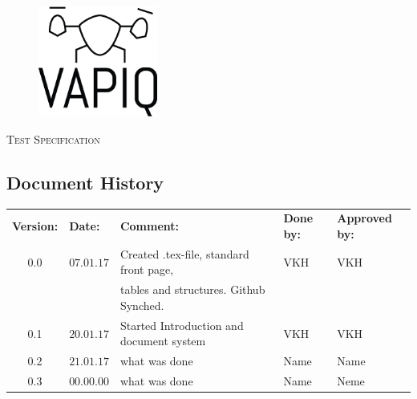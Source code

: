 \documentclass{article}
\author{Aleksander Holthe  \\ Katrine Sundal Haune \\ Kent Kjeldaas \\ Stian Fredriksen \\ Tomas Lyngroth \\ Vanja Katinka Halvorsen}
\makeatletter
\let\vapiqteam\@author
\makeatother
\begin{document}
\begin{titlepage}
    \centering
    \pagecolor{gainsboro}
	\\[3.0 cm]
    \begin{figure}[h]
        \centering
        \includegraphics[width = 0.35\textwidth]{VAPIQ-PICTURES//Logo2_Tilted.png}
        \\[2.0 cm] 
    \end{figure}                              
    \textsc{\Huge Test Specification}  
    \\[4 cm]
	\large \vapiqteam      
\end{titlepage}
\pagecolor{white}


\begin{center}
\section*{\textbf{Document History}}
\begin{tabular}{cllll}
\rowcolor{cadetgrey}
\textbf{Version:}    &\textbf{Date:} 	 &\textbf{Comment:}    &\textbf{Done by:}   &\textbf{Approved by:}  \\

0.0       & $07.01.17$   & Created .tex-file, standard front page, & VKH  & VKH \\
          &              & tables and structures. Github Synched.    &     & \\\rowcolor{gainsboro}
0.1       & $20.01.17$   & Started Introduction and document system  & VKH    & VKH          \\

0.2       & $21.01.17$   & what was done  & Name    & Name          \\ \rowcolor{gainsboro}
0.3       & $00.00.00$   & what was done  & Name    & Neme          \\
\end{tabular}                                                                   
\end{center}
\end{document}
